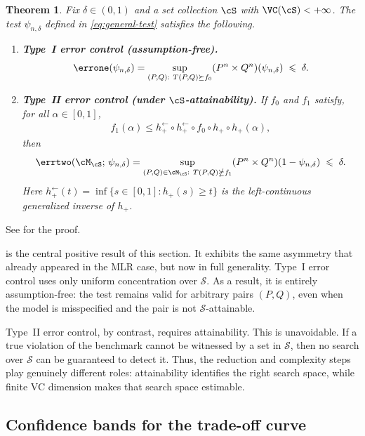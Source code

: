 \documentclass[english]{article}
\theoremstyle{plain}
\newtheorem{theorem}{Theorem}[section]
\theoremstyle{definition}
\newcommand{\hinv}{h_+^{\leftarrow}}
\newcommand{\Toff}[2]{T(#1,#2)}
\newcommand{\hupup}{h_+\mathbin{\circ}h_+}                 %
\newcommand{\hinvinv}{h_+^{\leftarrow}\mathbin{\circ}h_+^{\leftarrow}}  %
\newcommand{\fnull}{f_0}
\newcommand{\falt}{f_1}
\newcommand{\hup}{h_+}                             %
\begin{document}
\begin{theorem}\label{thm:general}
Fix $\delta\in(0,1)$ and a set collection $\cS$ with $\VC(\cS)<+\infty$.
The test $\psi_{n,\delta}$ defined in \eqref{eq:general-test} satisfies the
following.

\begin{enumerate}[label=(\roman*)]
\item \textbf{Type~I error control (assumption-free).}
\[
\errone(\psi_{n,\delta})
=
\sup_{(P,Q):\ \Toff{P}{Q}\succeq \fnull}
(P^n\times Q^n)(\psi_{n,\delta})
\;\leqslant\;
\delta.
\]

\item \textbf{Type~II error control (under $\cS$-attainability).}
If $\fnull$ and $\falt$ satisfy, for all $\alpha \in [0,1]$,
\begin{align} \label{eq:general-sep}
\falt(\alpha)\leqslant \hinvinv \circ \fnull\circ \hupup(\alpha),
\end{align}
then
\[
\errtwo(\cM_\cS;\, \psi_{n,\delta})
=
\sup_{(P,Q)\in\cM_\cS:\ \Toff{P}{Q}\nsucceq \falt}
(P^n\times Q^n)(1-\psi_{n,\delta})
\;\leqslant\;
\delta.
\]
Here $\hinv(t)=\inf\{s\in[0,1]:h_+(s)\geqslant t\}$ 
is the left-continuous generalized inverse of \(\hup\).
\end{enumerate}
\end{theorem}

\noindent See  for the proof.
\medskip

 is the central positive result of this section. It
exhibits the same asymmetry that already appeared in the MLR case, but now in
full generality. Type~I error control uses only uniform concentration over
\(\mathcal S\). As a result, it is entirely assumption-free: the test remains
valid for arbitrary pairs \((P,Q)\), even when the model is misspecified and
the pair is not \(\mathcal S\)-attainable.

Type~II error control, by contrast, requires attainability. This is
unavoidable. If a true violation of the benchmark cannot be witnessed by a set
in \(\mathcal S\), then no search over \(\mathcal S\) can be guaranteed to
detect it. Thus, the reduction and complexity steps play genuinely different
roles: attainability identifies the right search space, while finite VC
dimension makes that search space estimable.

\subsection{Confidence bands for the trade-off curve}
\end{document}
